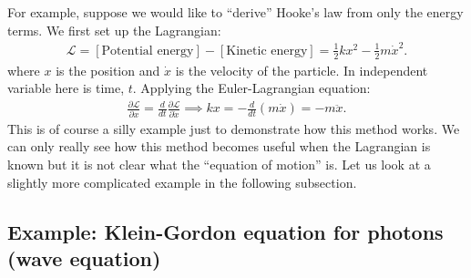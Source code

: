 \documentclass{article}
\newcommand{\p}{\partial}
\newcommand{\lag}{\mathcal{L}}
\newcommand{\f}[2]{\frac{#1}{#2}}
\begin{document}
For example, suppose we would like to ``derive'' Hooke's law from only the energy terms. We first set up the Lagrangian:
\begin{align}
\lag = [\text{Potential energy}] - [\text{Kinetic energy}] = \f{1}{2}kx^2 - \f{1}{2}m\dot{x}^2.
\end{align} 
where $x$ is the position and $\dot{x}$ is the velocity of the particle. In independent variable here is time, $t$. Applying the Euler-Lagrangian equation:
\begin{align}
\f{\p \lag}{\p x} = \f{d}{dt}\f{\p \lag}{\p \dot{x}} \implies kx = -\f{d}{dt}(m\dot{x}) = -m\ddot{x}.
\end{align}
This is of course a silly example just to demonstrate how this method works. We can only really see how this method becomes useful when the Lagrangian is known but it is not clear what the ``equation of motion'' is. Let us look at a slightly more complicated example in the following subsection.

\subsection{Example: Klein-Gordon equation for photons (wave equation)}
\end{document}
